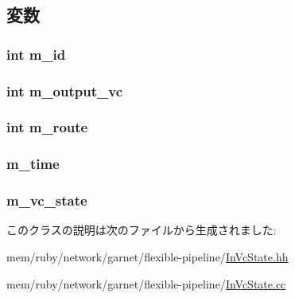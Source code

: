 \subsection{変数}
\hypertarget{classInVcState_aad966617e7e050bedbead762727808a5}{
\subsubsection[{m\_\-id}]{\setlength{\rightskip}{0pt plus 5cm}int {\bf m\_\-id}}}
\label{classInVcState_aad966617e7e050bedbead762727808a5}
\hypertarget{classInVcState_a8ed6a5033ed26f0b6181539a86ae153b}{
\subsubsection[{m\_\-output\_\-vc}]{\setlength{\rightskip}{0pt plus 5cm}int {\bf m\_\-output\_\-vc}}}
\label{classInVcState_a8ed6a5033ed26f0b6181539a86ae153b}
\hypertarget{classInVcState_aa268143da778d6edf497765655382f87}{
\subsubsection[{m\_\-route}]{\setlength{\rightskip}{0pt plus 5cm}int {\bf m\_\-route}}}
\label{classInVcState_aa268143da778d6edf497765655382f87}
\hypertarget{classInVcState_ac39faf9ea84c2e7518ba2f960c661636}{
\subsubsection[{m\_\-time}]{ {\bf m\_\-time}}}
\label{classInVcState_ac39faf9ea84c2e7518ba2f960c661636}
\hypertarget{classInVcState_a86eb725d7cda610fb5009d20a3690a4d}{
\subsubsection[{m\_\-vc\_\-state}]{ {\bf m\_\-vc\_\-state}}}
\label{classInVcState_a86eb725d7cda610fb5009d20a3690a4d}


このクラスの説明は次のファイルから生成されました:\begin{DoxyCompactItemize}
\item 
mem/ruby/network/garnet/flexible-\/pipeline/\hyperlink{InVcState_8hh}{InVcState.hh}\item 
mem/ruby/network/garnet/flexible-\/pipeline/\hyperlink{InVcState_8cc}{InVcState.cc}\end{DoxyCompactItemize}
